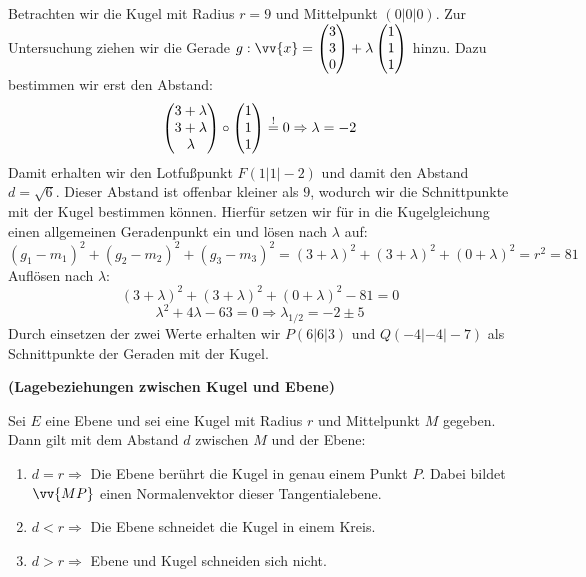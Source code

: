 \documentclass[ngerman, 12pt]{nssheetxea}
\begin{document}
\begin{example}
Betrachten wir die Kugel mit Radius $r=9$ und Mittelpunkt $(0|0|0)$. Zur Untersuchung ziehen wir die Gerade $g:\vv{x}=\colvec[3]{3}{0}+\lambda	\colvec[1]{1}{1}$ hinzu. Dazu bestimmen wir erst den Abstand:
\[ \colvec[3+\lambda]{3+\lambda}{\lambda} \circ \colvec[1]{1}{1} \stackrel{!}{=} 0 \Rightarrow \lambda = -2  \]
Damit erhalten wir den Lotfußpunkt $F(1|1|-2)$ und damit den Abstand $d=\sqrt{6}$. Dieser Abstand ist offenbar kleiner als $9$, wodurch wir die Schnittpunkte mit der Kugel bestimmen können. Hierfür setzen wir für in die Kugelgleichung einen allgemeinen Geradenpunkt ein und lösen nach $\lambda$ auf:
\[ (g_1-m_1)^2+(g_2-m_2)^2 + (g_3-m_3)^2 = (3+\lambda)^2 + (3+\lambda)^2 + (0+\lambda)^2 = r^2 = 81\]
Auflösen nach $\lambda$:
\[  (3+\lambda)^2 + (3+\lambda)^2 + (0+\lambda)^2 - 81 = 0 \]
\[ \lambda^2 + 4\lambda - 63 = 0 \Rightarrow \lambda_{1/2} = -2 \pm 5 \]
Durch einsetzen der zwei Werte erhalten wir $P(6|6|3)$ und $Q(-4|-4|-7)$ als Schnittpunkte der Geraden mit der Kugel.
\end{example}

\begin{theorem} \textbf{(Lagebeziehungen zwischen Kugel und Ebene)} \par
Sei $E$ eine Ebene und sei eine Kugel mit Radius $r$ und Mittelpunkt $M$ gegeben. Dann gilt mit dem Abstand $d$ zwischen $M$ und der Ebene:
\begin{enumerate}
\item $d=r \Rightarrow$ Die Ebene berührt die Kugel in genau einem Punkt $P$. Dabei bildet $\vv{MP}$ einen Normalenvektor dieser Tangentialebene.
\item $d<r\Rightarrow$ Die Ebene schneidet die Kugel in einem Kreis. 
\item $d>r \Rightarrow$ Ebene und Kugel schneiden sich nicht.
\end{enumerate}
\end{theorem}
\end{document}
